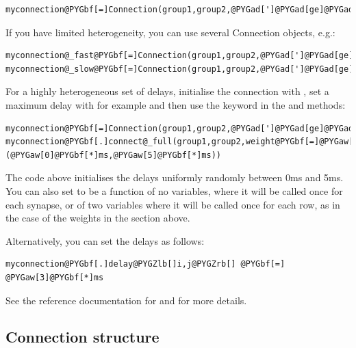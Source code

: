 \documentclass[letterpaper,10pt,english]{manual}
\begin{document}
\begin{Verbatim}[commandchars=@\[\]]
myconnection@PYGbf[=]Connection(group1,group2,@PYGad[']@PYGad[ge]@PYGad['],delay@PYGbf[=]@PYGaw[3]@PYGbf[*]ms)
\end{Verbatim}

If you have limited heterogeneity, you can use several Connection objects, e.g.:

\begin{Verbatim}[commandchars=@\[\]]
myconnection@_fast@PYGbf[=]Connection(group1,group2,@PYGad[']@PYGad[ge]@PYGad['],delay@PYGbf[=]@PYGaw[1]@PYGbf[*]ms)
myconnection@_slow@PYGbf[=]Connection(group1,group2,@PYGad[']@PYGad[ge]@PYGad['],delay@PYGbf[=]@PYGaw[5]@PYGbf[*]ms)
\end{Verbatim}

For a highly heterogeneous set of delays, initialise the connection with , set
a maximum delay with for example  and
then use the  keyword in the  and
 methods:

\begin{Verbatim}[commandchars=@\[\]]
myconnection@PYGbf[=]Connection(group1,group2,@PYGad[']@PYGad[ge]@PYGad['],delay@PYGbf[=]@PYGaA[True],max@_delay@PYGbf[=]@PYGaw[5]@PYGbf[*]ms)
myconnection@PYGbf[.]connect@_full(group1,group2,weight@PYGbf[=]@PYGaw[3]@PYGbf[*]nS,delay@PYGbf[=](@PYGaw[0]@PYGbf[*]ms,@PYGaw[5]@PYGbf[*]ms))
\end{Verbatim}

The code above initialises the delays uniformly randomly between 0ms and 5ms. You can also
set  to be a function of no variables, where it will be called once for each synapse,
or of two variables  where it will be called once for each row, as in the case of the
weights in the section above.

Alternatively, you can set the delays as follows:

\begin{Verbatim}[commandchars=@\[\]]
myconnection@PYGbf[.]delay@PYGZlb[]i,j@PYGZrb[] @PYGbf[=] @PYGaw[3]@PYGbf[*]ms
\end{Verbatim}

See the reference documentation for \hyperlink{brian.Connection}{} and \hyperlink{brian.DelayConnection}{} for
more details.


\subsection{Connection structure}
\end{document}
